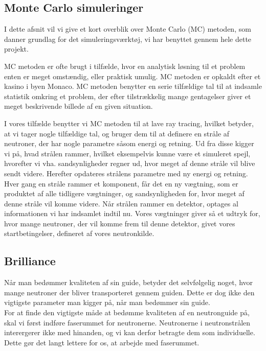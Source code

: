 \documentclass[12pt,oneside,a4paper]{article}
\begin{document}
{{{{{\subsection{Monte Carlo simuleringer}
I dette afsnit vil vi give et kort overblik over Monte Carlo (MC) metoden, som danner grundlag for det simuleringsværktøj, vi har benyttet gennem hele dette projekt.

MC metoden er ofte brugt i tilfælde, hvor en analytisk løsning til et problem enten er meget omstændig, eller praktisk umulig. MC metoden er opkaldt efter et kasino i byen Monaco. MC metoden benytter en serie tilfældige tal til at indsamle statistik omkring et problem, der efter tilstrækkelig mange gentagelser giver et meget beskrivende billede af en given situation.

I vores tilfælde benytter vi MC metoden til at lave ray tracing, hvilket betyder, at vi tager nogle tilfældige tal, og bruger dem til at definere en stråle af neutroner, der har nogle parametre såsom energi og retning.
Ud fra disse  kigger vi på, hvad strålen rammer, hvilket eksempelvis kunne være et simuleret spejl, hvorefter vi vha. sandsynligheder regner ud, hvor meget af denne stråle vil blive sendt videre. Herefter opdateres strålens parametre med ny energi og retning.
Hver gang en stråle rammer et komponent, får det en ny vægtning, som er produktet af alle tidligere vægtninger, og sandsynligheden for, hvor meget af denne stråle vil komme videre.
Når strålen rammer en detektor, optages al informationen vi har indsamlet indtil nu. Vores vægtninger giver så et udtryk for, hvor mange neutroner, der vil komme frem til denne detektor, givet vores startbetingelser, defineret af vores neutronkilde. \cite{wiki:monte_carlo}

\subsection{Brilliance}

Når man bedømmer kvaliteten af sin guide, betyder det selvfølgelig noget, hvor mange neutroner der bliver transporteret gennem guiden. Dette er dog ikke den vigtigste parameter man kigger på, når man bedømmer sin guide. 
\\


For at finde den vigtigste måde at bedømme kvaliteten af en neutronguide på, skal vi først indføre faserummet for neutronerne. Neutronerne i neutronstrålen interergerer ikke med hinanden, og vi kan derfor betragte dem som individuelle. Dette gør det langt lettere for os, at arbejde med faserummet. 
\\


}}}}}
\end{document}
